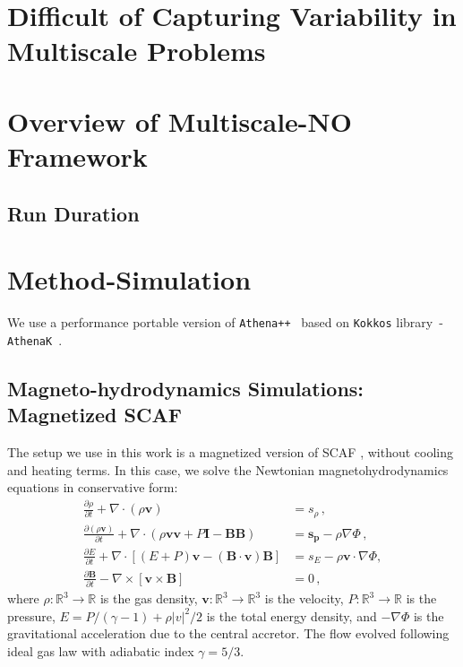 \documentclass[%
 reprint,
 superscriptaddress,
 amsmath,amssymb,
 nofootinbib,
 prd,
]{revtex4-2}
\begin{document}
\section{Difficult of Capturing Variability in Multiscale Problems}
\label{sec:variability}
                                                                                                                                 

\section{Overview of Multiscale-NO Framework}
\label{sec:overview}

\subsection{Run Duration}


\section{Method-Simulation}
\label{sec:method-simulation}

We use a performance portable version of \texttt{Athena++}~\cite{Stone2020} based on \texttt{Kokkos} library~\cite{Trott2021}-\texttt{AthenaK}~\cite{athenak}.

\subsection{Magneto-hydrodynamics Simulations: Magnetized SCAF}
The setup we use in this work is a magnetized version of SCAF \cite{Guo2024}, without cooling and heating terms. 
In this case, we solve the Newtonian magnetohydrodynamics equations in conservative form:
\begin{align}
    \frac{\partial \rho}{\partial t}+\nabla \cdot(\rho \boldsymbol{v}) &=s_{\rho}\,, \\
    \frac{\partial(\rho \boldsymbol{v})}{\partial t}+\nabla \cdot(\rho \boldsymbol{v} \boldsymbol{v} + P \boldsymbol{I}  - \boldsymbol{B}\boldsymbol{B})&=\boldsymbol{s_p}-\rho \nabla \Phi\,, \\
    \frac{\partial E}{\partial t}+\nabla \cdot[(E+{P}) \boldsymbol{v} - \left(\boldsymbol{B}\cdot \boldsymbol{v}\right) \boldsymbol{B}]&=s_E-\rho \boldsymbol{v} \cdot \nabla \Phi,\\
    \frac{\partial \boldsymbol{B}}{\partial t}-\nabla \times [ \boldsymbol{v} \times \boldsymbol{B} ]&=0\,,
\end{align}
where $\rho:\mathbb{R}^3\to\mathbb{R}$ is the gas density, $\boldsymbol{v}:\mathbb{R}^3\to\mathbb{R}^3$ is the velocity, $P:\mathbb{R}^3\to\mathbb{R}$ is the pressure, $E=P/(\gamma-1)+\rho |v|^2/2$ is the total energy density, and $-\nabla\Phi$ is the gravitational acceleration due to the central accretor. The flow evolved following ideal gas law with adiabatic index $\gamma=5/3$.
\end{document}
